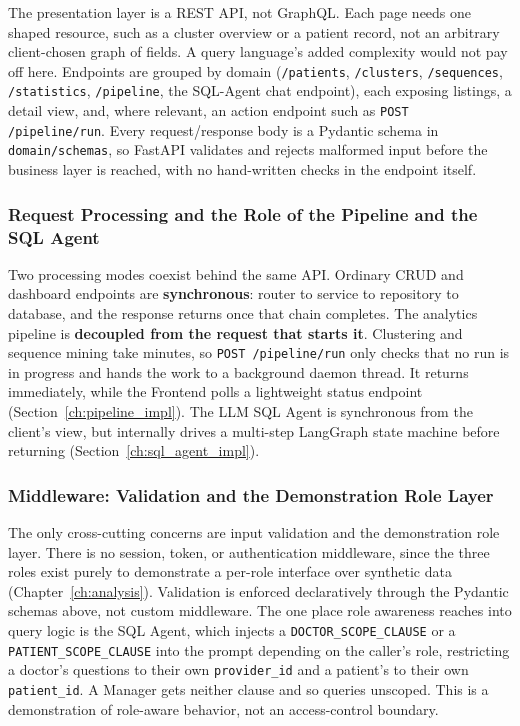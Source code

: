 The presentation layer is a REST API, not GraphQL. Each page needs one shaped resource, such as a cluster overview or a patient record, not an arbitrary client-chosen graph of fields. A query language's added complexity would not pay off here. Endpoints are grouped by domain (\texttt{/patients}, \texttt{/clusters}, \texttt{/sequences}, \texttt{/statistics}, \texttt{/pipeline}, the SQL-Agent chat endpoint), each exposing listings, a detail view, and, where relevant, an action endpoint such as \texttt{POST /pipeline/run}. Every request/response body is a Pydantic schema in \texttt{domain/schemas}, so FastAPI validates and rejects malformed input before the business layer is reached, with no hand-written checks in the endpoint itself.

\subsubsection*{Request Processing and the Role of the Pipeline and the SQL Agent}

Two processing modes coexist behind the same API. Ordinary CRUD and dashboard endpoints are \textbf{synchronous}: router to service to repository to database, and the response returns once that chain completes. The analytics pipeline is \textbf{decoupled from the request that starts it}. Clustering and sequence mining take minutes, so \texttt{POST /pipeline/run} only checks that no run is in progress and hands the work to a background daemon thread. It returns immediately, while the Frontend polls a lightweight status endpoint (Section~\ref{ch:pipeline_impl}). The LLM SQL Agent is synchronous from the client's view, but internally drives a multi-step LangGraph state machine before returning (Section~\ref{ch:sql_agent_impl}).

\subsubsection*{Middleware: Validation and the Demonstration Role Layer}

The only cross-cutting concerns are input validation and the demonstration role layer. There is no session, token, or authentication middleware, since the three roles exist purely to demonstrate a per-role interface over synthetic data (Chapter~\ref{ch:analysis}). Validation is enforced declaratively through the Pydantic schemas above, not custom middleware. The one place role awareness reaches into query logic is the SQL Agent, which injects a \texttt{DOCTOR\_SCOPE\_CLAUSE} or a \texttt{PATIENT\_SCOPE\_CLAUSE} into the prompt depending on the caller's role, restricting a doctor's questions to their own \texttt{provider\_id} and a patient's to their own \texttt{patient\_id}. A Manager gets neither clause and so queries unscoped. This is a demonstration of role-aware behavior, not an access-control boundary.


